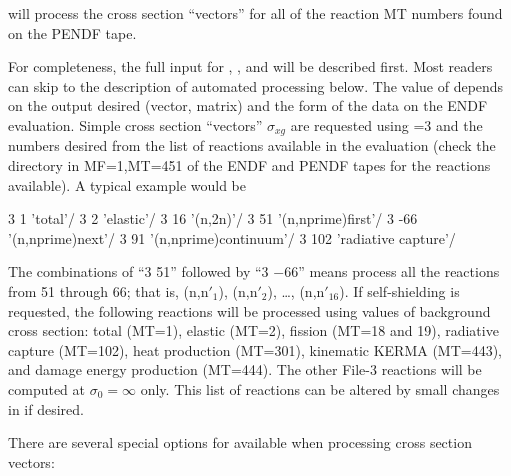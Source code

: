 \noindent
will process the cross section ``vectors'' for all of the reaction MT
numbers found on the PENDF tape.

For completeness, the full input for , ,
and  will be described first.  Most readers can skip
to the description of automated processing below.  The value of
 depends on the output desired (vector, matrix) and the
form of the data on the ENDF evaluation.  Simple cross section ``vectors''
$\sigma_{xg}$ are requested using =3 and the 
numbers desired from the list of reactions available in the evaluation
(check the directory in MF=1,MT=451 of the ENDF and PENDF tapes for the
reactions available).  A typical example would be

\small
\begin{ccode}

   3   1 'total'/
   3   2 'elastic'/
   3  16 '(n,2n)'/
   3  51 '(n,nprime)first'/
   3 -66 '(n,nprime)next'/
   3  91 '(n,nprime)continuum'/
   3 102 'radiative capture'/

\end{ccode}
\normalsize

\noindent
The combinations of ``3 51'' followed by ``3 $-$66'' means process all
the reactions from 51 through 66; that is, (n,n$'_1$), (n,n$'_2$),
\ldots, (n,n$'_{16}$).  If self-shielding is requested, the following
reactions will be processed using  values of background
cross section: total (MT=1), elastic (MT=2), fission (MT=18 and 19),
radiative capture (MT=102), heat production (MT=301), kinematic KERMA
(MT=443), and damage energy production (MT=444).  The other File-3
reactions will be computed at $\sigma_0{=}\infty$ only.  This list of
reactions can be altered by small changes in  if desired.

There are several special options for  available when processing
cross section vectors:


